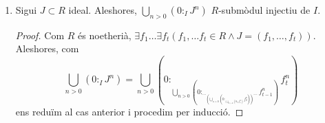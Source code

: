 \begin{lema}
\begin{enumerate}
\begin{proof}
        \end{proof}
        \item Sigui $J\subset R$ ideal. Aleshores, $\bigcup_{n>0}(0:_{I}J^{n})$ $R$-submòdul injectiu de $I$.
        \begin{proof}
            Com $R$ és noetherià, $\exists f_{1}\ldots\exists f_{t}(f_{1},\ldots f_{t}\in R\land J=(f_{1},\ldots,f_{t}))$. Aleshores, com
            \begin{equation*}
                \bigcup_{n>0}(0:_{I}J^{n})
                =\bigcup_{n>0}(0:_{\bigcup_{n>0}(0:_{\cdots_{(\bigcup_{n>0}(0:_{(\bigcup_{n>0}(0:_{I}f_{1}^{n})}f_{2}^{n}))}\cdots}f_{t-1}^{n})}f_{t}^{n})
            \end{equation*}
            ens reduïm al cas anterior i procedim per inducció.
        \end{proof}
    \end{enumerate}
\end{lema}
